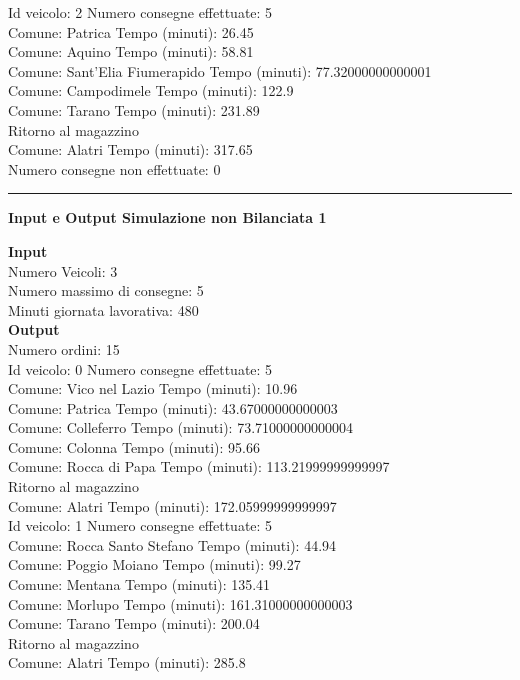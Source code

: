\documentclass[a4paper,12pt]{report}
\begin{document}
Id veicolo: 2	Numero consegne effettuate: 5\\
Comune: Patrica	 Tempo (minuti): 26.45\\
Comune: Aquino	 Tempo (minuti): 58.81\\
Comune: Sant'Elia Fiumerapido	 Tempo (minuti): 77.32000000000001\\
Comune: Campodimele	 Tempo (minuti): 122.9\\
Comune: Tarano	 Tempo (minuti): 231.89\\
Ritorno al magazzino\\
Comune: Alatri	 Tempo (minuti): 317.65\\

Numero consegne non effettuate: 0\\

\hrule
\begin{center}
\textbf{Input e Output Simulazione non Bilanciata 1}
\end{center}
\textbf{Input}\\
Numero Veicoli: 3\\
Numero massimo di consegne: 5\\
Minuti giornata lavorativa: 480\\
\textbf{Output}\\
Numero ordini: 15\\

Id veicolo: 0	Numero consegne effettuate: 5\\
Comune: Vico nel Lazio	 Tempo (minuti): 10.96\\
Comune: Patrica	 Tempo (minuti): 43.67000000000003\\
Comune: Colleferro	 Tempo (minuti): 73.71000000000004\\
Comune: Colonna	 Tempo (minuti): 95.66\\
Comune: Rocca di Papa	 Tempo (minuti): 113.21999999999997\\
Ritorno al magazzino\\
Comune: Alatri	 Tempo (minuti): 172.05999999999997\\

Id veicolo: 1	Numero consegne effettuate: 5\\
Comune: Rocca Santo Stefano	 Tempo (minuti): 44.94\\
Comune: Poggio Moiano	 Tempo (minuti): 99.27\\
Comune: Mentana	 Tempo (minuti): 135.41\\
Comune: Morlupo	 Tempo (minuti): 161.31000000000003\\
Comune: Tarano	 Tempo (minuti): 200.04\\
Ritorno al magazzino\\
Comune: Alatri	 Tempo (minuti): 285.8\\
\end{document}
